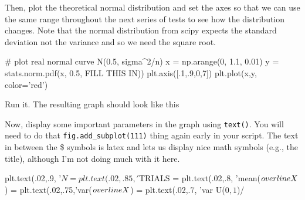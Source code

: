 \begin{fullwidth}
\step Then, plot the theoretical normal distribution and set the axes so that we can use the same range throughout the next series of tests to see how the distribution changes. Note that the normal distribution from scipy expects the standard deviation not the variance and so we need the square root.

\begin{pyverbatim}
# plot real normal curve N(0.5, sigma^2/n)
x = np.arange(0, 1.1, 0.01)
y = stats.norm.pdf(x, 0.5, FILL THIS IN))
plt.axis([.1,.9,0,7])
plt.plot(x,y, color='red')
\end{pyverbatim}

\step Run it. The resulting graph should look like this \\


\step Now, display some important parameters in the graph using {\tt text()}. You will need to do that {\tt fig.add\_subplot(111)} thing again early in your script. The text in between the \$ symbols is latex and lets us display nice math symbols (e.g., the title), although I'm not doing much with it here.

{\small
\begin{pyverbatim}
plt.text(.02,.9, '$N = %
plt.text(.02,.85,'$TRIALS = %
plt.text(.02,.8, 'mean($\\overline{X}$) = %
plt.text(.02,.75,'var($\\overline{X}$) = %
plt.text(.02,.7, 'var U($0,1$)/%


\end{pyverbatim}}
\end{fullwidth}
